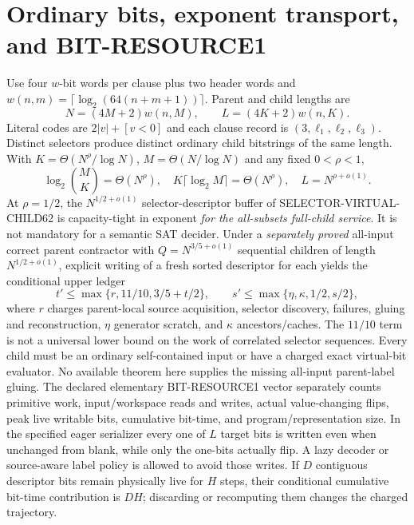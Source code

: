 \documentclass[11pt]{article}
\begin{document}
\section{Ordinary bits, exponent transport, and BIT-RESOURCE1}
Use four $w$-bit words per clause plus two header words and $w(n,m)=\lceil\log_2(64(n+m+1))\rceil$. Parent and child lengths are
\[
N=(4M+2)w(n,M),\qquad L=(4K+2)w(n,K).
\]
Literal codes are $2|v|+[v<0]$ and each clause record is $(3,\ell_1,\ell_2,\ell_3)$. Distinct selectors produce distinct ordinary child bitstrings of the same length. With $K=\Theta(N^\rho/\log N)$, $M=\Theta(N/\log N)$ and any fixed $0<\rho<1$,
\[
\log_2\binom MK=\Theta(N^\rho),\quad
K\lceil\log_2 M\rceil=\Theta(N^\rho),\quad
L=N^{\rho+o(1)}.
\]
At $\rho=1/2$, the $N^{1/2+o(1)}$ selector-descriptor buffer of SELECTOR-VIRTUAL-CHILD62 is capacity-tight in exponent \emph{for the all-subsets full-child service}. It is not mandatory for a semantic SAT decider.
Under a \emph{separately proved} all-input correct parent contractor with $Q=N^{3/5+o(1)}$ sequential children of length $N^{1/2+o(1)}$, explicit writing of a fresh sorted descriptor for each yields the conditional upper ledger
\[
t'\le\max\{r,11/10,3/5+t/2\},\qquad
s'\le\max\{\eta,\kappa,1/2,s/2\},
\]
where $r$ charges parent-local source acquisition, selector discovery, failures, gluing and reconstruction, $\eta$ generator scratch, and $\kappa$ ancestors/caches. The $11/10$ term is not a universal lower bound on the work of correlated selector sequences. Every child must be an ordinary self-contained input or have a charged exact virtual-bit evaluator. No available theorem here supplies the missing all-input parent-label gluing.
The declared elementary BIT-RESOURCE1 vector separately counts primitive work, input/workspace reads and writes, actual value-changing flips, peak live writable bits, cumulative bit-time, and program/representation size. In the specified eager serializer every one of $L$ target bits is written even when unchanged from blank, while only the one-bits actually flip. A lazy decoder or source-aware label policy is allowed to avoid those writes. If $D$ contiguous descriptor bits remain physically live for $H$ steps, their conditional cumulative bit-time contribution is $DH$; discarding or recomputing them changes the charged trajectory.
\end{document}
